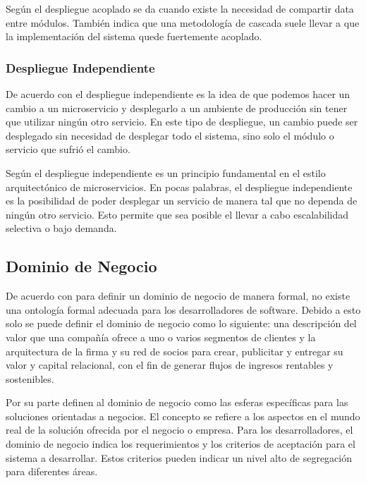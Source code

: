 Según \cite{nadareishvili2016microservice} el despliegue acoplado se da cuando existe la necesidad
de compartir data entre módulos.
También indica que una metodología de cascada suele llevar a que la implementación del sistema
quede fuertemente acoplado.


\subsubsection{Despliegue Independiente}

De acuerdo con \cite{newman2019monolith} el despliegue independiente es la idea de que podemos
hacer un cambio a un microservicio y desplegarlo a un ambiente de producción sin tener que utilizar
ningún otro servicio.
En este tipo de despliegue, un cambio puede ser desplegado sin necesidad de desplegar todo el sistema,
sino solo el módulo o servicio que sufrió el cambio.

Según \cite{nadareishvili2016microservice} el despliegue independiente es un principio fundamental
en el estilo arquitectónico de microservicios.
En pocas palabras, el despliegue independiente es la posibilidad de poder desplegar un 
servicio de manera tal que no dependa de ningún otro servicio.
Esto permite que sea posible el llevar a cabo escalabilidad selectiva o bajo demanda.


\subsection{Dominio de Negocio}

De acuerdo con \cite{bosselmann2014domain} para definir un dominio de negocio de manera formal,
no existe una ontología formal adecuada para los desarrolladores de software.
Debido a esto solo se puede definir el dominio de negocio como lo siguiente: una descripción
del valor que una compañía ofrece a uno o varios segmentos de clientes y la arquitectura de
la firma y su red de socios para crear, publicitar y entregar su valor y capital relacional,
con el fin de generar flujos de ingresos rentables y sostenibles.

Por su parte \cite{heidari2021ontology} definen al dominio de negocio como las esferas específicas
para las soluciones orientadas a negocios.
El concepto se refiere a los aspectos en el mundo real de la solución ofrecida por el negocio o empresa.
Para los desarrolladores, el dominio de negocio indica los requerimientos y los criterios de aceptación
para el sistema a desarrollar.
Estos criterios pueden indicar un nivel alto de segregación para diferentes áreas.


